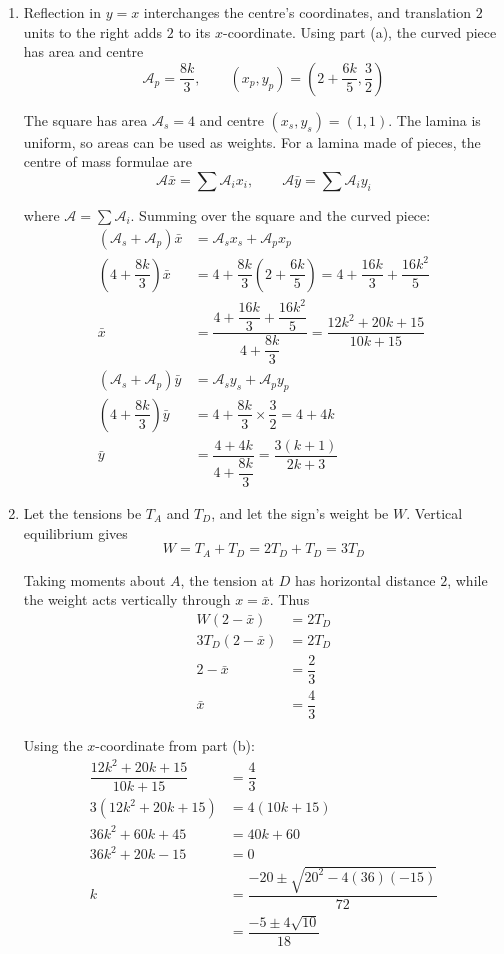 \documentclass[leqno]{article}
\begin{document}
\begin{enumerate}[
  label=\textbf{\arabic*.},
  leftmargin=*,
  topsep=0pt,
  partopsep=0pt,
  parsep=0pt
]
\begin{djsSolution}
\begin{enumerate}[label=\textbf{(\alph*)}, start=1]
\item
Reflection in \(y=x\) interchanges the centre's coordinates, and translation \(2\) units to the right adds \(2\) to its \(x\)-coordinate. Using part (a), the curved piece has area and centre
\[
\mathcal A_p=\dfrac{8k}{3},
\qquad
(x_p,y_p)=\left(2+\dfrac{6k}{5},\dfrac32\right)
\]

The square has area \(\mathcal A_s=4\) and centre \((x_s,y_s)=(1,1)\). The lamina is uniform, so areas can be used as weights. For a lamina made of pieces, the centre of mass formulae are
\[
\mathcal{A}\bar{x}=\sum\mathcal{A}_ix_i,
\qquad
\mathcal{A}\bar{y}=\sum\mathcal{A}_iy_i
\]

where \(\mathcal{A}=\sum\mathcal{A}_i\). Summing over the square and the curved piece:
\begin{align*}
(\mathcal{A}_s+\mathcal{A}_p)\bar{x}&=\mathcal{A}_sx_s+\mathcal{A}_px_p\\
\left(4+\dfrac{8k}{3}\right)\bar{x}&=4+\dfrac{8k}{3}\left(2+\dfrac{6k}{5}\right)
=4+\dfrac{16k}{3}+\dfrac{16k^2}{5}\\
\bar{x}&=\dfrac{4+\dfrac{16k}{3}+\dfrac{16k^2}{5}}{4+\dfrac{8k}{3}}
=\dfrac{12k^2+20k+15}{10k+15}\\
(\mathcal{A}_s+\mathcal{A}_p)\bar{y}&=\mathcal{A}_sy_s+\mathcal{A}_py_p\\
\left(4+\dfrac{8k}{3}\right)\bar{y}&=4+\dfrac{8k}{3}\times\dfrac32
=4+4k\\
\bar{y}&=\dfrac{4+4k}{4+\dfrac{8k}{3}}
=\dfrac{3(k+1)}{2k+3}
\end{align*}

\item Let the tensions be \(T_A\) and \(T_D\), and let the sign's weight be \(W\). Vertical equilibrium gives
\[
W=T_A+T_D=2T_D+T_D=3T_D
\]

Taking moments about \(A\), the tension at \(D\) has horizontal distance \(2\), while the weight acts vertically through \(x=\bar{x}\). Thus
\begin{align*}
W(2-\bar{x})&=2T_D\\
3T_D(2-\bar{x})&=2T_D\\
2-\bar{x}&=\dfrac23\\
\bar{x}&=\dfrac43
\end{align*}

Using the \(x\)-coordinate from part (b):
\begin{align*}
\dfrac{12k^2+20k+15}{10k+15}&=\dfrac43\\
3(12k^2+20k+15)&=4(10k+15)\\
36k^2+60k+45&=40k+60\\
36k^2+20k-15&=0\\
k&=\dfrac{-20\pm\sqrt{20^2-4(36)(-15)}}{72}\\
&=\dfrac{-5\pm4\sqrt{10}}{18}
\end{align*}


\end{enumerate}
\end{djsSolution}
\end{enumerate}
\end{document}
